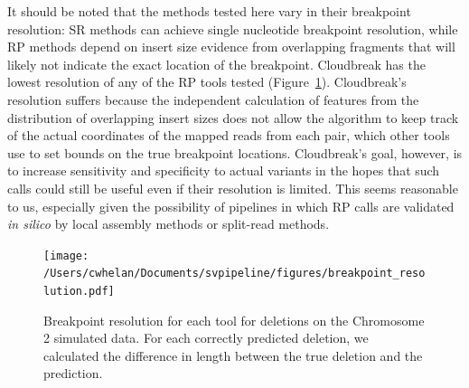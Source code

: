 It should be noted that the methods tested here vary in their breakpoint resolution: SR methods can achieve single nucleotide breakpoint resolution, while RP methods depend on insert size evidence from overlapping fragments that will likely not indicate the exact location of the breakpoint. Cloudbreak has the lowest resolution of any of the RP tools tested (Figure~\ref{breakpoint_resolution}). Cloudbreak's resolution suffers because the independent calculation of features from the distribution of overlapping insert sizes does not allow the algorithm to keep track of the actual coordinates of the mapped reads from each pair, which other tools use to set bounds on the true breakpoint locations. Cloudbreak's goal, however, is to increase sensitivity and specificity to actual variants in the hopes that such calls could still be useful even if their resolution is limited. This seems reasonable to us, especially given the possibility of pipelines in which RP calls are validated \emph{in silico} by local assembly methods or split-read methods.

\begin{figure}
\centering
\texttt{[image: /Users/cwhelan/Documents/svpipeline/figures/breakpoint\_resolution.pdf]}
\caption{Breakpoint resolution for each tool for deletions on the Chromosome 2 simulated data. For each correctly predicted deletion, we calculated the difference in length between the true deletion and the prediction.}
\label{breakpoint_resolution}
\end{figure}

